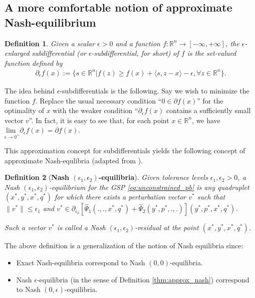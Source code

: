 \documentclass[a4paper,9pt]{extarticle}
\newtheorem{definition}{Definition}
\begin{document}
\subsection{A more comfortable notion of approximate Nash-equilibrium}
\begin{definition}
  Given a scalar $\epsilon > 0$ and a function $f:\mathbb{R}^n
  \rightarrow [-\infty,+\infty]$, the $\epsilon$-enlarged
  subdifferential (or
  $\epsilon$-subdifferential, for short) of $f$ is the set-valued
  function defined by
  \begin{eqnarray}
\partial_\epsilon f(x):= \{s \in \mathbb{R}^n | f(z)
\ge f(x) + \langle s, z - x\rangle - \epsilon,\forall z \in
\mathbb{R}^n\}.
\end{eqnarray}
\end{definition}
The idea behind $\epsilon$-subdifferentials is the following. Say we wish
to minimize the function $f$. Replace the usual necessary
condition ``$0 \in \partial f(x)$'' for the optimality of $x$ with the
weaker condition ``$\partial_\epsilon f(x)$ contains a sufficiently
small vector $v$''. In fact, it is easy to see that, for each
point $x \in \mathbb{R}^n$, we have $\underset{\epsilon \rightarrow
  0^+}{\text{lim }}\partial_\epsilon f(x) = \partial f(x)$.

This approximation concept for subdifferentials yields the following
concept of approximate Nash-equlibria (adapted from
\cite{he2013accelerating}).

\begin{definition}[\textbf{Nash $(\epsilon_1,\epsilon_2)$-equilibria}]
Given tolerance levels $\epsilon_1, \epsilon_2 > 0$, a Nash
$(\epsilon_1,\epsilon_2)$-equilibrium for the GSP \eqref{eq:unconstrained_pb}
is any quadruplet $(x^*, y^*, x^*, q^*)$ for which
there exists a perturbation vector $v^*$ such that
$\|v^*\| \le \epsilon_1$ and $v^* \in
\partial_{\epsilon_2}[\hat{\Psi}_1(., ., x^*, q^*) +
  \hat{\Psi}_2(y^*, p^*, ., .)](y^*,p^*,x^*,q^*)$.

Such a vector $v^*$ is called a Nash $(\epsilon_1,
\epsilon_2)$-residual at the point $(x^*,
y^*, x^*, q^*)$.
\label{thm:cool_notion}
\end{definition}


The above definition is a generalization of the notion of Nash
equilibria since:
\begin{itemize}
\item Exact Nash-equilibria correspond to Nash $(0,0)$-equilibria.
\item Nash $\epsilon$-equilibria (in the sense of Definition
  \ref{thm:approx_nash}) correspond to Nash $(0,\epsilon)$-equilibria.
\end{itemize}
\end{document}
